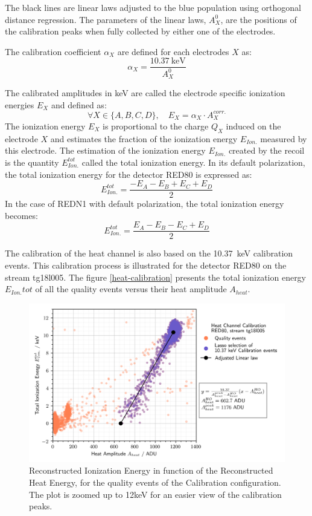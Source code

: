The black lines are linear laws adjusted to the blue population using orthogonal distance regression. The parameters of the linear laws, $A_X^0$, are the positions of the calibration peaks when fully collected by either one of the electrodes. 

The calibration coefficient $\alpha_X$ are defined for each electrodes $X$ as:
\begin{equation}
\alpha_X = \frac{\SI{10.37}{\kilo\eV}}{A_X^0}
\end{equation}

The calibrated amplitudes in \si{\kilo\eV} are called the electrode specific ionization energies $E_X$ and defined as:
\begin{equation}
\forall X \in \{ A, B ,C,D \}, \quad 
E_X = \alpha_X \cdot A_X^{corr.}
\end{equation}
The ionization energy $E_X$ is proportional to the charge $Q_X$ induced on the electrode $X$ and estimates the fraction of the ionization energy $E_{Ion.}$ measured by this electrode. The estimation of the ionization energy $E_{Ion.}$ created by the recoil is the quantity $E_{Ion.}^{tot}$ called the total ionization energy. In its default polarization, the total ionization energy for the detector RED80 is expressed as:
\begin{equation}
E_{Ion.}^{tot} = \frac{-E_A -E_B + E_C + E_D}{2}
\end{equation}
In the case of REDN1 with default polarization, the total ionization energy becomes:
\begin{equation}
E_{Ion.}^{tot} = \frac{E_A - E_B - E_C + E_D}{2}
\end{equation}

The calibration of the heat channel is also based on the \SI{10.37}{\kilo\eV} calibration events. This calibration process is illustrated for the detector RED80 on the stream tg18l005. The figure \ref{heat-calibration} presents the total ionization energy $E_{Ion.}{tot}$ of all the quality events versus their heat amplitude $A_{heat}$.

\begin{figure}
\centering
\includegraphics[width=\linewidth,]{Figures/ElectrodesExperimental/heat_calibration.png}
\caption{Reconstructed Ionization Energy in function of the Reconstructed Heat Energy, for the quality events of the Calibration configuration. The plot is zoomed up to 12keV for an easier view of the calibration peaks. }
\label{fig:heat-calibration}
\end{figure}

